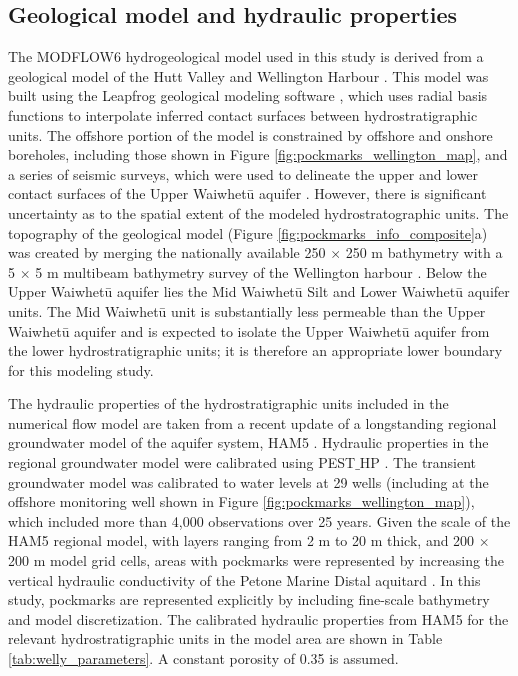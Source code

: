 \documentclass[draft, 10pt]{agujournal2019}
\begin{document}
\subsection{Geological model and hydraulic properties}
The MODFLOW6 hydrogeological model used in this study is derived from a geological model of the Hutt Valley and Wellington Harbour \cite{begg_revised_2023}.
This model was built using the Leapfrog geological modeling software \cite{seequent_ltd_leapfrog_2020},
which uses radial basis functions to interpolate inferred contact surfaces between hydrostratigraphic units.
The offshore portion of the model is constrained by offshore and onshore boreholes, including those shown in Figure \ref{fig:pockmarks_wellington_map},
and a series of seismic surveys, which were used to delineate the upper and lower contact surfaces of the Upper Waiwhetū aquifer \cite{stantec_gear_2022, begg_lower_2020}.
However, there is significant uncertainty as to the spatial extent of the modeled hydrostratographic units.
The topography of the geological model (Figure \ref{fig:pockmarks_info_composite}a) was created by merging the nationally available 250 $\times$ 250 m bathymetry \cite{niwa_new_2016} with a 5 $\times$ 5 m multibeam bathymetry survey of the Wellington harbour \cite{hoffmann_fresh_2023}.
Below the Upper Waiwhetū aquifer lies the Mid Waiwhetū Silt and Lower Waiwhetū aquifer units.
The Mid Waiwhetū unit is substantially less permeable than the Upper Waiwhetū aquifer and is expected to isolate the Upper Waiwhetū aquifer from the lower hydrostratigraphic units;
it is therefore an appropriate lower boundary for this modeling study.

The hydraulic properties of the hydrostratigraphic units included in the numerical flow model are taken from a recent update of a longstanding regional groundwater model of the aquifer system,
HAM5 \cite{bennett_hutt_2024}.
Hydraulic properties in the regional groundwater model were calibrated using PEST$\_$HP \cite{doherty_pest_hp_2017}.
The transient groundwater model was calibrated to water levels at 29 wells (including at the offshore monitoring well shown in Figure \ref{fig:pockmarks_wellington_map}),
which included more than 4,000 observations over 25 years.
Given the scale of the HAM5 regional model, with layers ranging from 2 m to 20 m thick, and 200 $\times$ 200 m model grid cells,
areas with pockmarks were represented by increasing the vertical hydraulic conductivity of the Petone Marine Distal aquitard \cite{kaleris_modelling_2002}.
In this study, pockmarks are represented explicitly by including fine-scale bathymetry and model discretization.
The calibrated hydraulic properties from HAM5 for the relevant hydrostratigraphic units in the model area are shown in Table \ref{tab:welly_parameters}.
A constant porosity of 0.35 is assumed.
\end{document}

